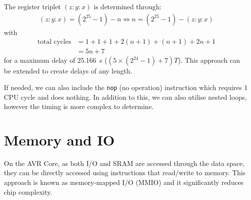 \documentclass{report}
\begin{document}
The register triplet \(\left( z:y:x \right)\) is determined through:
\begin{align*}
    \left( z:y:x \right) = \left( 2^{25} - 1 \right) - n \iff n = \left( 2^{25} - 1 \right) - \left( z:y:x \right)
\end{align*}
with
\begin{align*}
    \text{total cycles} & = 1 + 1 + 1 + 2 \left( n + 1 \right) + \left( n + 1 \right) + 2 n + 1 \\
                        & = 5n + 7
\end{align*}
for a maximum delay of \qty{25.166}{s} (\(\left(5 \times \left( 2^{24} - 1 \right) + 7 \right) T\)).
This approach can be extended to create delays of any length.

If needed, we can also include the \texttt{nop} (no operation) instruction which requires 1 CPU cycle and does nothing.
In addition to this, we can also utilise nested loops, however the timing is more complex to determine.
\section{Memory and IO}
On the AVR Core, as both I/O and SRAM are accessed through the data space, they can be
directly accessed using instructions that read/write to memory. This approach is known as memory-mapped I/O (MMIO)
and it significantly reduces chip complexity.
\end{document}
